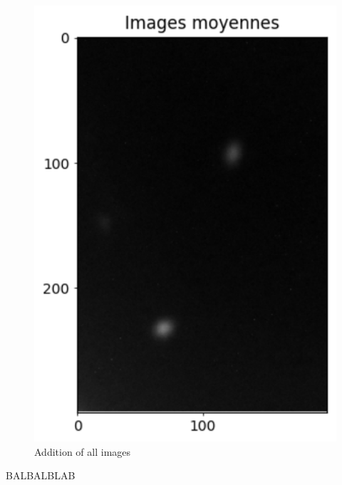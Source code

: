 \begin{figure}[H]
    \centering
    \includegraphics[scale=0.85]{assets/figures/MesuresResultats/ImageMoyenne.png}
    \caption{Addition of all images}
    \label{fig:MES_ImaMoy}
\end{figure}
BALBALBLAB
